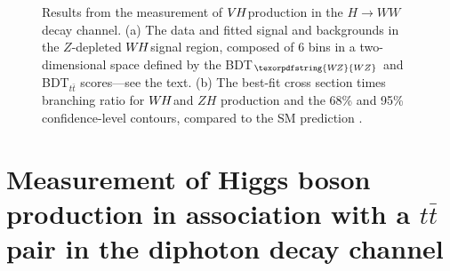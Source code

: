 \documentclass{moriond}
\def\wh{\texorpdfstring{\ensuremath{W\kern -0.1em H}\xspace}{WH\xspace}}
\def\wz{\texorpdfstring{\ensuremath{W\kern -0.1em Z}\xspace}{WZ\xspace}}
\def\vh{\texorpdfstring{\ensuremath{V\kern -0.1em H}\xspace}{VH\xspace}}
\def\zh{\ensuremath{ZH}\xspace}
\def\ttbar{\ensuremath{t\bar{t}}\xspace}
\begin{document}
\begin{figure}[!htbp]
  \centering
  \caption{
    Results from the measurement of \vh production in the $H{\rightarrow}WW$ decay channel.
    (a) The data and fitted signal and backgrounds in the $Z$-depleted \wh signal region, composed of 6 bins in a
    two-dimensional space defined by the BDT$_{\wz}$ and BDT$_{\ttbar}$ scores---see the text.
    (b) The best-fit cross section times branching ratio for \wh and \zh production and the 68\% and
    95\% confidence-level contours, compared to the SM prediction \cite{HIGG-2017-14}.
  }
  \label{fig:ww_vh}
\end{figure}

\section{Measurement of Higgs boson production in association with a $t\bar t$ pair in the diphoton decay channel}\label{sec:ttH_yy}
\end{document}
